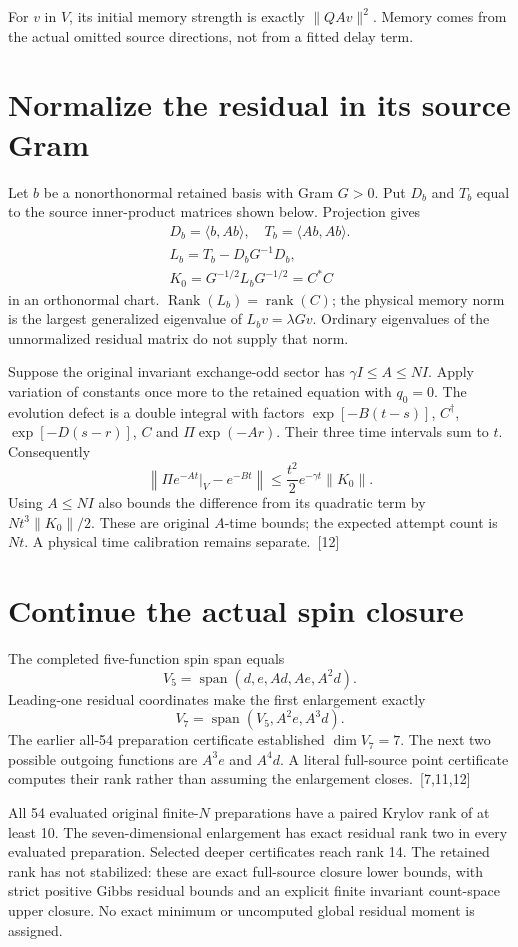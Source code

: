 \documentclass[10pt,twocolumn,letterpaper]{article}
\begin{document}
For $v$ in $V$, its initial memory strength is exactly $\|QAv\|^2$. Memory comes from the actual omitted source directions, not from a fitted delay term.

\section{Normalize the residual in its source Gram}
Let $b$ be a nonorthonormal retained basis with Gram $G>0$. Put $D_b$ and $T_b$ equal to the source inner-product matrices shown below. Projection gives
\[
\begin{gathered}
D_b=\langle b,Ab\rangle,\quad T_b=\langle Ab,Ab\rangle.\\
L_b=T_b-D_bG^{-1}D_b,\\
K_0=G^{-1/2}L_bG^{-1/2}=C^*C
\end{gathered}
\]
in an orthonormal chart. $\operatorname{Rank}(L_b)=\operatorname{rank}(C)$; the physical memory norm is the largest generalized eigenvalue of $L_bv=\lambda Gv$. Ordinary eigenvalues of the unnormalized residual matrix do not supply that norm.

Suppose the original invariant exchange-odd sector has $\gamma I\leq A\leq NI$. Apply variation of constants once more to the retained equation with $q_0=0$. The evolution defect is a double integral with factors $\exp[-B(t-s)]$, $C^\dagger$, $\exp[-D(s-r)]$, $C$ and $\Pi\exp(-Ar)$. Their three time intervals sum to $t$. Consequently
\[
\left\|\Pi e^{-At}|_V-e^{-Bt}\right\|\leq\frac{t^2}{2}e^{-\gamma t}\|K_0\|.
\]
Using $A\leq NI$ also bounds the difference from its quadratic term by $Nt^3\|K_0\|/2$. These are original $A$-time bounds; the expected attempt count is $Nt$. A physical time calibration remains separate.~[12]

\section{Continue the actual spin closure}
The completed five-function spin span equals
\[
V_5=\operatorname{span}(d,e,Ad,Ae,A^2d).
\]
Leading-one residual coordinates make the first enlargement exactly
\[
V_7=\operatorname{span}(V_5,A^2e,A^3d).
\]
The earlier all-54 preparation certificate established $\dim V_7=7$. The next two possible outgoing functions are $A^3e$ and $A^4d$. A literal full-source point certificate computes their rank rather than assuming the enlargement closes.~[7,11,12]

All 54 evaluated original finite-$N$ preparations have a paired Krylov rank of at least 10. The seven-dimensional enlargement has exact residual rank two in every evaluated preparation. Selected deeper certificates reach rank 14. The retained rank has not stabilized: these are exact full-source closure lower bounds, with strict positive Gibbs residual bounds and an explicit finite invariant count-space upper closure. No exact minimum or uncomputed global residual moment is assigned.
\end{document}
